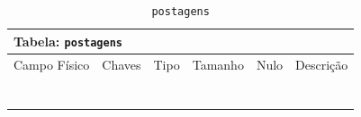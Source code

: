 \documentclass[12pt,a4paper]{article}
\begin{document}
\begin{center}
\begin{table}[h!]
	\caption{\texttt{postagens}}
	\label{tabela:postagens}
	\begin{tabular}{|p{2.5cm}|p{1cm}|p{1.25cm}|p{1.75cm}|p{1.25cm}|p{5cm}|}\hline	
		\multicolumn{6}{|p{16cm}|}{\cellcolor{cinzaClaro}  \centering Tabela: \texttt{postagens}} \\ \hline %
		{\small Campo Físico}   & {\small Chaves} & {\small Tipo} & {\small Tamanho} & {\small Nulo} & {\small Descrição}\\\hline %
		
		{\tiny } & {\tiny } & {\tiny } & {\tiny } & {\tiny } &{\tiny }\\\hline
		{\tiny } & {\tiny } & {\tiny } & {\tiny } & {\tiny } &{\tiny }\\\hline
		{\tiny } & {\tiny } & {\tiny } & {\tiny } & {\tiny } &{\tiny }\\\hline
		{\tiny } & {\tiny } & {\tiny } & {\tiny } & {\tiny } &{\tiny }\\\hline
		{\tiny } & {\tiny } & {\tiny } & {\tiny } & {\tiny } &{\tiny }\\\hline
		{\tiny } & {\tiny } & {\tiny } & {\tiny } & {\tiny } &{\tiny }\\\hline
		{\tiny } & {\tiny } & {\tiny } & {\tiny } & {\tiny } &{\tiny }\\\hline
		
			
	\end{tabular}
\end{table}	
\end{center}
\end{document}
